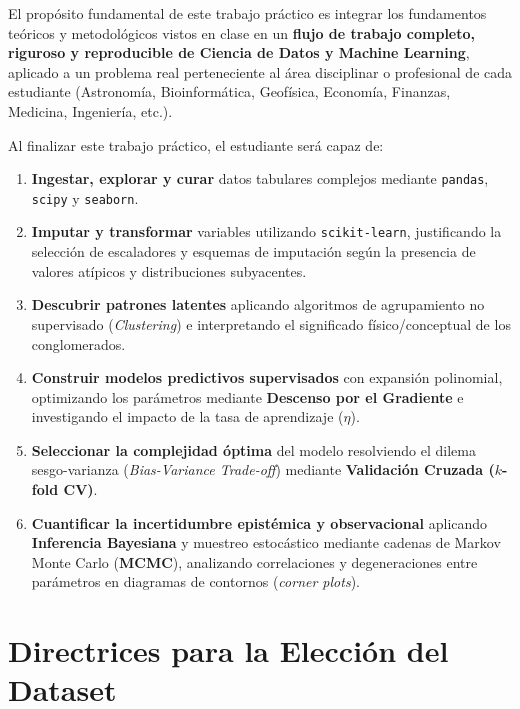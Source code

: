 \documentclass[11pt,a4paper]{article}
\begin{document}
\begin{objetivobox}
El propósito fundamental de este trabajo práctico es integrar los fundamentos teóricos y metodológicos vistos en clase en un \textbf{flujo de trabajo completo, riguroso y reproducible de Ciencia de Datos y Machine Learning}, aplicado a un problema real perteneciente al área disciplinar o profesional de cada estudiante (Astronomía, Bioinformática, Geofísica, Economía, Finanzas, Medicina, Ingeniería, etc.).

Al finalizar este trabajo práctico, el estudiante será capaz de:
\begin{enumerate}[leftmargin=*,itemsep=1pt]
    \item \textbf{Ingestar, explorar y curar} datos tabulares complejos mediante \texttt{pandas}, \texttt{scipy} y \texttt{seaborn}.
    \item \textbf{Imputar y transformar} variables utilizando \texttt{scikit-learn}, justificando la selección de escaladores y esquemas de imputación según la presencia de valores atípicos y distribuciones subyacentes.
    \item \textbf{Descubrir patrones latentes} aplicando algoritmos de agrupamiento no supervisado (\textit{Clustering}) e interpretando el significado físico/conceptual de los conglomerados.
    \item \textbf{Construir modelos predictivos supervisados} con expansión polinomial, optimizando los parámetros mediante \textbf{Descenso por el Gradiente} e investigando el impacto de la tasa de aprendizaje ($\eta$).
    \item \textbf{Seleccionar la complejidad óptima} del modelo resolviendo el dilema sesgo-varianza (\textit{Bias-Variance Trade-off}) mediante \textbf{Validación Cruzada ($k$-fold CV)}.
    \item \textbf{Cuantificar la incertidumbre epistémica y observacional} aplicando \textbf{Inferencia Bayesiana} y muestreo estocástico mediante cadenas de Markov Monte Carlo (\textbf{MCMC}), analizando correlaciones y degeneraciones entre parámetros en diagramas de contornos (\textit{corner plots}).
\end{enumerate}
\end{objetivobox}

\section{Directrices para la Elección del Dataset}
\label{sec:dataset}
\end{document}
